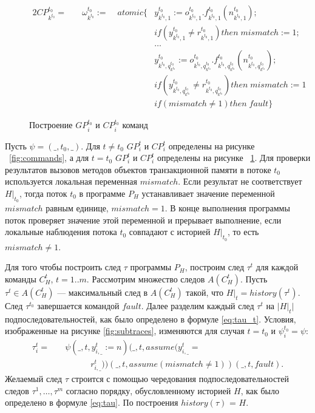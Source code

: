 \begin{myproof}
\begin{figure}
\begin{itemize}
\begin{alignat}{2}
     CP^{t_0}_{k^{t_0}} =&\quad \omega^{t_0}_{k^{t_0}} := &\; atomic\{&y^{t_0}_{k^{t_0},1} := o^{t_0}_{k^{t_0},1}.f^{t_0}_{k^{t_0},1}(n^{t_0}_{k^{t_0},1}); \nonumber \\ 
     &&& if \left (y^{t_0}_{k^{t_0},1} \neq r^{t_0}_{k^{t_0},1}\right) then \; mismatch := 1; \nonumber \\
         &           &&\ldots \nonumber \\
         & && y^{t_0}_{k^{t_0},q^{t_0}_{k^{t_0}}} := o^{t_0}_{k^{t_0},q^{t_0}_{k^{t_0}}}.f^{t_0}_{k^{t_0},q^{t_0}_{k^{t_0}}}(n^{t_0}_{k^{t_0},q^{t_0}_{k^{t_0}}}); 
         \nonumber \\ 
         &&& if \left (y^{t_0}_{k^{t_0},q^{t_0}_{k^{t_0}}} \neq r^{t_0}_{k^{t_0},q^{t_0}_{k^{t_0}}}\right) then \; mismatch := 1 \nonumber \\
         &&& if \left(mismatch \neq 1 \right) then \; fault \} \nonumber
\end{alignat}
\end{itemize}
\caption{Построение $GP^{t_0}_i$ и $CP^{t_0}_i$ команд}
\label{fig:commands_t0}
\end{figure}

Пусть $\psi = (\_,t_0,\_)$. Для $t \neq t_0$ $GP^t_i$ и $CP^t_i$ определены на рисунке ~\ref{fig:commands}, а для $t = t_0$ $GP^t_i$ и $CP^t_i$ определены на рисунке ~\ref{fig:commands_t0}. Для проверки результатов вызовов методов объектов транзакционной памяти в потоке $t_0$ используется локальная переменная $mismatch$. Если результат не соответствует $H|_{t_0}$, тогда поток $t_0$ в программе $P_H$ устанавливает значение переменной $mismatch$ равным единице, $mismatch = 1$. В конце выполнения программы поток проверяет значение этой переменной и прерывает выполнение, если локальные наблюдения потока $t_0$ совпадают с историей $H|_{t_0}$, то есть $mismatch \neq 1$.

Для того чтобы построить след $\tau$ программы $P_H$, построим след $\tau^t$ для каждой команды $C^t_H$, $t = 1..m$. Рассмотрим множество следов $A(C^t_H)$. Пусть $\tau^t \in A(C^t_H)$ --- максимальный след в $A(C^t_H)$ такой, что $H|_t = history(\tau^t)$. След $\tau^{t_0}$ завершается командой $fault$. Далее разделим каждый след $\tau^t$ на $|H|_t|$ подпоследовательностей, как было определено в формуле \eqref{eq:tau_t}. Условия, изображенные на рисунке \ref{fig:subtraces}, изменяются для случая $t=t_0$ и $\psi^{t_0}_i = \psi$:
\begin{align}
\tau^t_i = &\quad \psi(\_, t, y^t_{i,\_} := n)(\_, t, assume(y^t_{i,\_} = \nonumber \\
&\qquad \qquad r^t_{i,\_}))(\_, t, assume(mismatch \neq 1))(\_, t, fault). \nonumber
\end{align}
Желаемый след $\tau$ строится с помощью чередования подпоследовательностей следов $\tau^1,\ldots,\tau^m$ согласно порядку, обусловленному историей $H$, как было определено в формуле \eqref{eq:tau}. По построения $history(\tau)$ = $H$.


\end{myproof}
